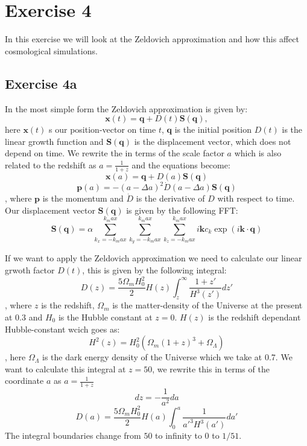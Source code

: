 \section{Exercise 4}
In this exercise we will look at the Zeldovich approximation and how this affect cosmological simulations.

\subsection{Exercise 4a}
In the most simple form the Zeldovich approximation is given by:
\begin{equation}
\mathbf{x}(t)=\mathbf{q}+D(t)\mathbf{S(q)},
\end{equation}
here $\mathbf{x}(t)$ s our position-vector on time $t$, $\mathbf{q}$ is the initial position $D(t)$ is the linear growth function and $\mathbf{S(q)}$ is the displacement vector, which does not depend on time.
We rewrite the in terms of the scale factor $a$ which is also related to the redshift as $a=\frac{1}{1+z}$ and the equations become:
\begin{equation}
\mathbf{x}(a)=\mathbf{q}+D(a)\mathbf{S(q)} 
\end{equation}
\begin{equation}
\mathbf{p}(a)=-(a-\Delta a)^2\dot{D}(a-\Delta a)\mathbf{S(q)}
\end{equation}
, where $\mathbf{p}$ is the momentum and $\dot{D}$ is the derivative of $D$ with respect to time. Our displacement vector $\mathbf{S(q)}$ is given by the following FFT:
\begin{equation}
\mathbf{S(q)}=\alpha\displaystyle\sum_{k_x=-k_max}^{k_max}\sum_{k_y=-k_max}^{k_max}\sum_{k_z=-k_max}^{k_max}{i\mathbf{k}c_k\exp(i\mathbf{k}\cdot\mathbf{q})}
\end{equation}

If we want to apply the Zeldovich approximation we need to calculate our linear grwoth factor $D(t)$, this is given by the following integral:
\begin{equation}
    D(z)=\frac{5\Omega_m H_0^2}{2}H(z)\displaystyle\int_{z}^{\infty}{\frac{1+z'}{H^3(z')}dz'}
\end{equation}
, where $z$ is the redshift, $\Omega_m$ is the matter-density of the Universe at the present at 0.3 and $H_0$ is the Hubble constant at $z=0$. $H(z)$ is the redshift dependant Hubble-constant wcich goes as:
\begin{equation}
    H^2(z)=H_0^2\left(\Omega_m(1+z)^3+\Omega_{\Lambda}\right)
\end{equation}
, here $\Omega_{\Lambda}$ is the dark energy density of the Universe which we take at 0.7.
We want to calculate this integral at $z=50$, we rewrite this in terms of the coordinate $a$ as $a=\frac{1}{1+z}$
\begin{equation}
    dz=-\frac{1}{a^2}da
\end{equation}
\begin{equation}
    D(a)=\frac{5\Omega_m H_0^2}{2}H(a)\displaystyle\int_{0}^{a}{\frac{1}{a'^3H^3(a')}da'}
\end{equation}
The integral boundaries change from $50$ to infinity to $0$ to $1/51$.

